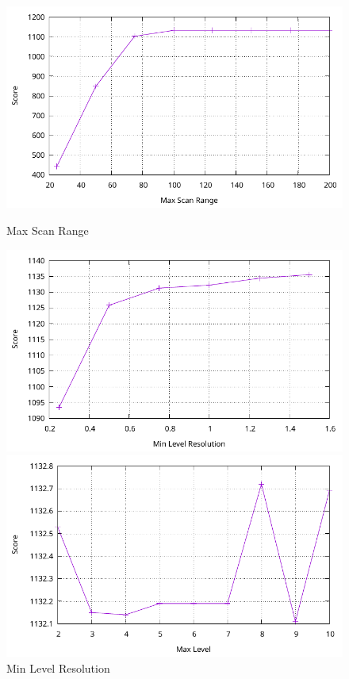 \begin{figure}[t]
    \centering
    \begin{minipage}{0.32\textwidth}
        \centering
        \includegraphics[width=\textwidth]{../02-global-localization/plots/max_scan_range.pdf}
        \caption{Max Scan Range}
    \end{minipage}
    \hfill
    \begin{minipage}{0.32\textwidth}
        \centering
        \includegraphics[width=\textwidth]{../02-global-localization/plots/min_level_res.pdf}
        \caption{Min Level Resolution}
    \end{minipage}
    \hfill
    \begin{minipage}{0.32\textwidth}
        \centering
        \includegraphics[width=\textwidth]{../02-global-localization/plots/max_level.pdf}

\end{minipage}
\end{figure}
